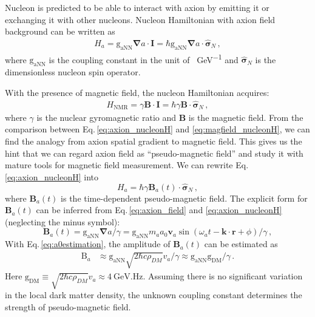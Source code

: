 Nucleon is predicted to be able to interact with axion by emitting it or exchanging it with other nucleons\cite{GrahamNewobservables_PhysRevD.88.035023}. Nucleon Hamiltonian with axion field background can be written as
\begin{align}
    H_a = \mathrm{g_{aNN}} {\boldsymbol \nabla} a \cdot \mathbf{I} 
    = \hbar \mathrm{g_{aNN}} {\boldsymbol \nabla} a \cdot \hat{\boldsymbol \sigma}_{N}\,,\label{eq:axion_nucleonH}
\end{align}
where $\mathrm{g_{aNN}}$ is the coupling constant in the unit of \SI{}{\GeV^{-1}} and $\hat{\boldsymbol \sigma}_{N}$ is the dimensionless nucleon spin operator. 

With the presence of magnetic field, the nucleon Hamiltonian acquires:
\begin{align}
    H_{\mathrm{NMR}} = \gamma \mathbf{B} \cdot \mathbf{I}
    = \hbar \gamma \mathbf{B} \cdot \hat{\boldsymbol \sigma}_{N}\,,\label{eq:magfield_nucleonH}
\end{align}
where $\gamma$ is the nuclear gyromagnetic ratio and $\mathbf{B}$ is the magnetic field. From the comparison between Eq.\,\eqref{eq:axion_nucleonH} and \eqref{eq:magfield_nucleonH}, we can find the analogy from axion spatial gradient to magnetic field. This gives us the hint that we can regard axion field as ``pseudo-magnetic field'' and study it with mature tools for magnetic field measurement. We can rewrite Eq.\,\eqref{eq:axion_nucleonH} into
\begin{equation}\label{eq:pseudo-magfield_nucleonH}
    H_a =\hbar \gamma \mathbf{B}_{a}(t) \cdot \hat{\boldsymbol \sigma}_{N}\,,
\end{equation}
where $\mathbf{B}_{a}(t)$ is the time-dependent pseudo-magnetic field. The explicit form for $\mathbf{B}_{a}(t)$ can be inferred from Eq.\,\eqref{eq:axion_field} and \eqref{eq:axion_nucleonH} (neglecting the minus symbol):
\begin{equation}
    \mathbf{B}_{a}(t) = \mathrm{g_{aNN}} {\boldsymbol \nabla}a/ \gamma = \mathrm{g_{aNN}} m_a a_0 \mathbf{v}_a \sin(\omega_a t - \mathbf{k}\cdot \mathbf{r} + \phi) / \gamma\,, \label{eq:Bat_a0}
\end{equation}
With Eq.\,\eqref{eq:a0estimation}, the amplitude of $\mathbf{B}_{a}(t)$ can be estimated as
\begin{align}
    \mathrm{B}_{a} &\approx \mathrm{g_{aNN}} \sqrt{2 \hbar c \rho_{DM}} v_a / \gamma  
    \approx  \mathrm{g_{aNN}} \mathrm{g_{DM}}  / \gamma 
    \,.\label{eq:Ba_gaNN_rhoDM}
\end{align}
Here $\mathrm{g_{DM}} \equiv \sqrt{2 \hbar c \rho_{DM}} v_a \approx \SI{4}{\GeV.\Hz}$. Assuming there is no significant variation in the local dark matter density, the unknown coupling constant determines the strength of pseudo-magnetic field. 
